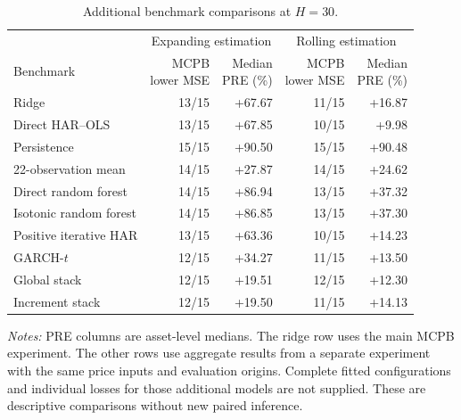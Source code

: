 \begin{table}[tbp]
\centering\small
\setlength{\tabcolsep}{4pt}
\renewcommand{\arraystretch}{1.12}
\caption{Additional benchmark comparisons at $H=30$.}
\label{tab:archival}
\begin{tabular}{lrrrr}
\toprule
 & \multicolumn{2}{c}{Expanding estimation} & \multicolumn{2}{c}{Rolling estimation} \\
\cmidrule(lr){2-3}\cmidrule(lr){4-5}
Benchmark & \shortstack{MCPB\\lower MSE} & \shortstack{Median\\PRE (\%)} & \shortstack{MCPB\\lower MSE} & \shortstack{Median\\PRE (\%)} \\
\midrule
Ridge & 13/15 & +67.67 & 11/15 & +16.87 \\
Direct HAR--OLS & 13/15 & +67.85 & 10/15 & +9.98 \\
Persistence & 15/15 & +90.50 & 15/15 & +90.48 \\
22-observation mean & 14/15 & +27.87 & 14/15 & +24.62 \\
Direct random forest & 14/15 & +86.94 & 13/15 & +37.32 \\
Isotonic random forest & 14/15 & +86.85 & 13/15 & +37.30 \\
Positive iterative HAR & 13/15 & +63.36 & 10/15 & +14.23 \\
GARCH-$t$ & 12/15 & +34.27 & 11/15 & +13.50 \\
Global stack & 12/15 & +19.51 & 12/15 & +12.30 \\
Increment stack & 12/15 & +19.50 & 11/15 & +14.13 \\
\bottomrule
\end{tabular}
\par\smallskip
\begin{minipage}{0.98\linewidth}\footnotesize
\textit{Notes:} PRE columns are asset-level medians. The ridge row uses the main MCPB experiment. The other rows use aggregate results from a separate experiment with the same price inputs and evaluation origins. Complete fitted configurations and individual losses for those additional models are not supplied. These are descriptive comparisons without new paired inference.
\end{minipage}
\end{table}

